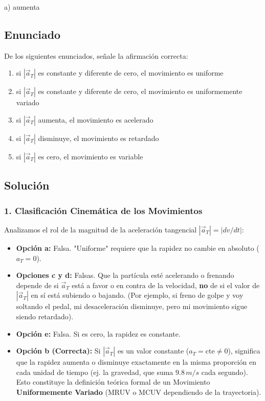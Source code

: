 \documentclass[12pt, a4paper]{article}
\begin{document}
\begin{tcolorbox}[colback=green!5!white, colframe=green!50!black, title=Respuesta Final]
\centering \Large a) aumenta
\end{tcolorbox}

\newpage

\subsection*{Enunciado}
De los siguientes enunciados, señale la afirmación correcta:
\begin{enumerate}[label=\alph*)]
    \item si $|\vec{a}_T|$ es constante y diferente de cero, el movimiento es uniforme
    \item si $|\vec{a}_T|$ es constante y diferente de cero, el movimiento es uniformemente variado
    \item si $|\vec{a}_T|$ aumenta, el movimiento es acelerado
    \item si $|\vec{a}_T|$ disminuye, el movimiento es retardado
    \item si $|\vec{a}_T|$ es cero, el movimiento es variable
\end{enumerate}

\subsection*{Solución}

\subsubsection*{1. Clasificación Cinemática de los Movimientos}
Analizamos el rol de la magnitud de la aceleración tangencial $|\vec{a}_T| = |dv/dt|$:
\begin{itemize}
    \item \textbf{Opción a:} Falsa. "Uniforme" requiere que la rapidez no cambie en absoluto ($a_T = 0$).
    \item \textbf{Opciones c y d:} Falsas. Que la partícula esté acelerando o frenando depende de si $\vec{a}_T$ está a favor o en contra de la velocidad, \textbf{no} de si el valor de $|\vec{a}_T|$ en sí está subiendo o bajando. (Por ejemplo, si freno de golpe y voy soltando el pedal, mi desaceleración disminuye, pero mi movimiento sigue siendo retardado).
    \item \textbf{Opción e:} Falsa. Si es cero, la rapidez es constante.
    \item \textbf{Opción b (Correcta):} Si $|\vec{a}_T|$ es un valor constante ($a_T = \text{cte} \neq 0$), significa que la rapidez aumenta o disminuye exactamente en la misma proporción en cada unidad de tiempo (ej. la gravedad, que suma $9.8\,\si{m/s}$ cada segundo). Esto constituye la definición teórica formal de un Movimiento \textbf{Uniformemente Variado} (MRUV o MCUV dependiendo de la trayectoria).
\end{itemize}
\end{document}
